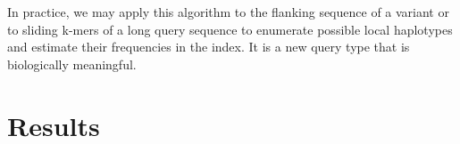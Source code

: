 \documentclass[webpdf,contemporary,large,namedate]{oup-authoring-template}%
\begin{document}
In practice, we may apply this algorithm to the flanking sequence of a variant
or to sliding k-mers of a long query sequence to enumerate possible local haplotypes and estimate their frequencies in the index.
It is a new query type that is biologically meaningful.

\section{Results}

\end{document}
